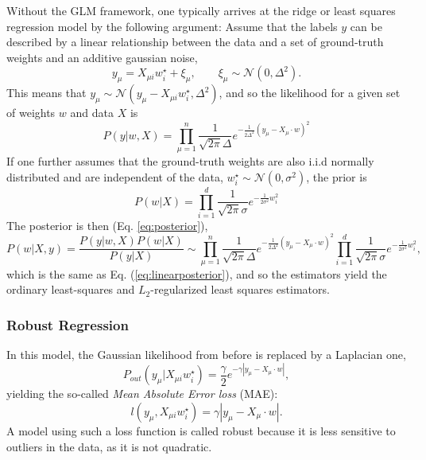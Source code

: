 \documentclass{article}
\begin{document}
\noindent Without the GLM framework, one typically arrives at the ridge or least squares regression model by the following argument: Assume that the labels $y$ can be described by a linear relationship between the data and a set of ground-truth weights and an additive gaussian noise,
\begin{equation}
    y_{\mu} = X_{\mu i} w_i^{\star} + \xi_{\mu},
    \quad \quad
    \xi_{\mu} \sim \mathcal{N}(0,\Delta^2).
\end{equation}
This means that $y_{\mu} \sim \mathcal{N}(y_{\mu}-X_{\mu i} w^{\star}_i,\Delta^2)$, and so the likelihood for a given set of weights $w$ and data $X$ is
\begin{equation}
    P(y|w,X)
    =
    \prod_{\mu=1}^{n}
    \frac{1}{\sqrt{2\pi}\Delta}e^{-\frac{1}{2\Delta^2} (y_{\mu} - X_{\mu} \cdot w)^2}
\end{equation}
If one further assumes that the ground-truth weights are also i.i.d normally distributed and are independent of the data, $w_i^{\star} \sim \mathcal{N}(0,\sigma^2)$, the prior is
\begin{equation}
    P(w|X)
    =
    \prod_{i=1}^{d}
    \frac{1}{\sqrt{2\pi}\sigma}e^{-\frac{1}{2\sigma^2}w_i^2}
\end{equation}
The posterior is then (Eq. \ref{eq:posterior}),
\begin{equation}
    P(w | X,y)
    =
    \frac{P(y | w,X) P(w|X)}{P(y|X)}
    \sim
    \prod_{\mu=1}^{n}
    \frac{1}{\sqrt{2\pi}\Delta}e^{-\frac{1}{2\Delta^2} (y_{\mu} - X_{\mu} \cdot w)^2}
    \prod_{i=1}^{d}
    \frac{1}{\sqrt{2\pi}\sigma}e^{-\frac{1}{2\sigma^2}w_i^2},
\end{equation}
which is the same as Eq. (\ref{eq:linearposterior}), and so the estimators yield the ordinary least-squares and $L_2$-regularized least squares estimators.
\subsubsection*{Robust Regression}
In this model, the Gaussian likelihood from before is replaced by a Laplacian one,
\begin{equation}
    P_{out} (y_{\mu} | X_{\mu i} w^{\star}_i)
    =
    \frac{\gamma}{2}e^{-\gamma |y_{\mu} - X_{\mu} \cdot w|},
\end{equation}
yielding the so-called \emph{Mean Absolute Error loss} (MAE):
\begin{equation}
    l(y_{\mu}, X_{\mu i} w^{\star}_i)
    =
    \gamma|y_{\mu} - X_{\mu} \cdot w|.
\end{equation}
A model using such a loss function is called robust because it is less sensitive to outliers in the data, as it is not quadratic.
\end{document}
